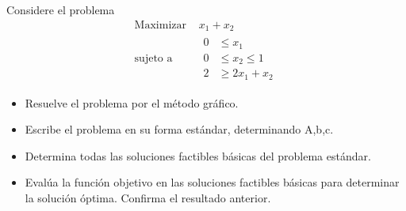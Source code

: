 \documentclass{article}
\begin{document}
Considere el problema
\begin{equation*}
  \begin{aligned}
    \text{Maximizar } & x_1+x_2\\
    \text{sujeto a } &
    \begin{aligned}
      0 &\leq x_1\\
      0 &\leq x_2\leq 1\\
      2 &\geq 2x_1+x_2
    \end{aligned}
  \end{aligned}
\end{equation*}
\begin{itemize}
\item Resuelve el problema por el método gráfico.
\item Escribe el problema en su forma estándar, determinando A,b,c.
\item Determina todas las soluciones factibles básicas del problema estándar.
\item Evalúa la función objetivo en las soluciones factibles básicas para determinar la solución óptima. Confirma el resultado anterior.
\end{itemize}
\end{document}
